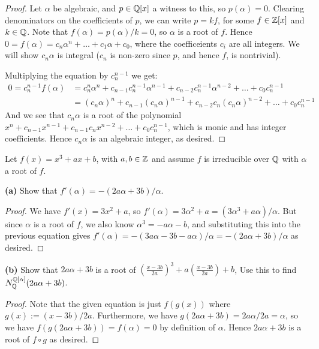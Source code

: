 \documentclass[11pt]{article}
\begin{document}
\begin{proof}
  Let $\alpha$ be algebraic, and $p \in \mathbb{Q}[x]$ a witness to this, so $p(\alpha) = 0$.
  Clearing denominators on the coefficients of $p$, we can write $p = kf$, for some $f \in \mathbb{Z}[x]$ and $k \in \mathbb{Q}$.
  Note that $f(\alpha) = p(\alpha)/k = 0$, so $\alpha$ is a root of $f$.
  Hence $0 = f(\alpha) = c_n\alpha^n + \dots + c_1\alpha + c_0$, where the coefficeients $c_i$ are all integers.
  We will show $c_n\alpha$ is integral ($c_n$ is non-zero since $p$, and hence $f$, is nontrivial).
  
  Multiplying the equation by $c_n^{n-1}$ we get:
  \begin{align*}
    0 = c_n^{n-1} f(\alpha)
    &= c_n^n\alpha^n + c_{n-1}c_n^{n-1}\alpha^{n-1} + c_{n-2}c_n^{n-1}\alpha^{n-2} + \dots + c_0c_n^{n-1} \\
    &= (c_n\alpha)^n + c_{n-1}(c_n\alpha)^{n-1} + c_{n-2}c_n(c_n\alpha)^{n-2} + \dots + c_0c_n^{n-1}
  \end{align*}
  And we see that $c_n\alpha$ is a root of the polynomial $x^n + c_{n-1}x^{n-1} + c_{n-1}c_nx^{n-2} + \dots + c_0 c_n^{n-1}$, which is monic and has integer coefficients.
  Hence $c_n\alpha$ is an algebraic integer, as desired.
\end{proof}


Let $f(x) = x^3 + ax + b$, with $a,b \in \mathbb{Z}$ and assume $f$ is irreducible over $\mathbb{Q}$ with $\alpha$ a root of $f$.

\textbf{(a)} Show that $f'(\alpha) = -(2a\alpha + 3b)/\alpha$.

\begin{proof}
  We have $f'(x) = 3x^2 + a$, so $f'(\alpha) = 3\alpha^2 + a = (3\alpha^3 + a\alpha)/\alpha$.
  But since $\alpha$ is a root of $f$, we also know $\alpha^3 = -a\alpha - b$, and substituting this into the previous equation gives $f'(\alpha) = -(3a\alpha - 3b - a\alpha)/\alpha = -(2a\alpha + 3b)/\alpha$ as desired.
\end{proof}

\textbf{(b)} Show that $2a\alpha+3b$ is a root of $(\frac{x-3b}{2a})^3+a(\frac{x-3b}{2a})+b$, Use this to find $N_{\mathbb{Q}}^{\mathbb{Q}[\alpha]}(2a\alpha+3b)$.

\begin{proof}
  Note that the given equation is just $f(g(x))$ where $g(x):=(x-3b)/2a$.
  Furthermore, we have $g(2a\alpha+3b)=2a\alpha/2a=\alpha$, so we have $f(g(2a\alpha+3b)) = f(\alpha) = 0$ by definition of $\alpha$.
  Hence $2a\alpha+3b$ is a root of $f \circ g$ as desired.
\end{proof}
\end{document}
